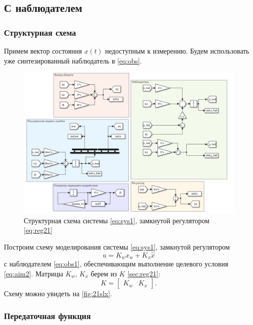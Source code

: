 \subsection{С наблюдателем}

\subsubsection{Структурная схема}

Примем вектор состояния $x(t)$ недоступным к измерению. Будем использовать
уже синтезированный наблюдатель в \autoref{eq:obs}.
\begin{figure}[H]
    \centering
    \includegraphics[width=\linewidth]{figs/2_1_slx.png}
    \caption{Структурная схема системы \eqref{eq:sys1}, замкнутой регулятором
    \eqref{eq:reg21}}
    \label{fig:21slx}
\end{figure}
\noindent Построим схему моделирования системы \eqref{eq:sys1}, замкнутой регулятором
\begin{equation}
    \label{eq:reg21}
    u=K_wx_w+K_x\hat x
\end{equation}
с наблюдателем \eqref{eq:obs1},
обеспечивающим выполнение целевого условия \eqref{eq:aim2}. Матрицы $K_w$, $K_x$
берем из $K$ \autoref{sec:reg21}:
\begin{equation*}
    K=\begin{bmatrix}
        K_w & K_x
    \end{bmatrix}.
\end{equation*}
Схему можно увидеть на \autoref{fig:21slx}. 

\subsubsection{Передаточная функция}

